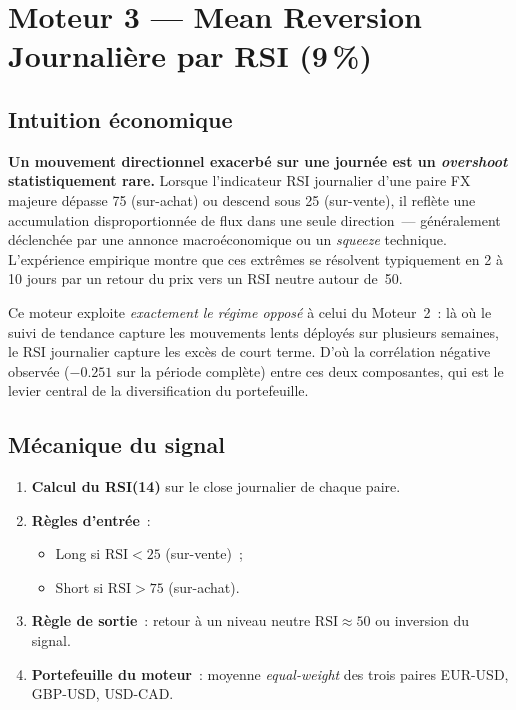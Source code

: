 \section{Moteur 3 --- Mean Reversion Journalière par RSI (9\,\%)}
\label{sec:rsi_daily}

\subsection{Intuition économique}

\begin{thesisbox}
\textbf{Un mouvement directionnel exacerbé sur une journée est un \emph{overshoot} statistiquement rare.} Lorsque l'indicateur RSI journalier d'une paire FX majeure dépasse 75 (sur-achat) ou descend sous 25 (sur-vente), il reflète une accumulation disproportionnée de flux dans une seule direction~--- généralement déclenchée par une annonce macroéconomique ou un \emph{squeeze} technique. L'expérience empirique montre que ces extrêmes se résolvent typiquement en 2 à 10 jours par un retour du prix vers un RSI neutre autour de~50.
\end{thesisbox}

Ce moteur exploite \emph{exactement le régime opposé} à celui du Moteur~2~: là où le suivi de tendance capture les mouvements lents déployés sur plusieurs semaines, le RSI journalier capture les excès de court terme. D'où la corrélation négative observée ($-0.251$ sur la période complète) entre ces deux composantes, qui est le levier central de la diversification du portefeuille.

\subsection{Mécanique du signal}

\begin{enumerate}
\item \textbf{Calcul du RSI(14)} sur le close journalier de chaque paire.
\item \textbf{Règles d'entrée}~:
  \begin{itemize}
  \item Long si $\mathrm{RSI} < 25$ (sur-vente)~;
  \item Short si $\mathrm{RSI} > 75$ (sur-achat).
  \end{itemize}
\item \textbf{Règle de sortie}~: retour à un niveau neutre $\mathrm{RSI} \approx 50$ ou inversion du signal.
\item \textbf{Portefeuille du moteur}~: moyenne \emph{equal-weight} des trois paires EUR-USD, GBP-USD, USD-CAD.
\end{enumerate}

